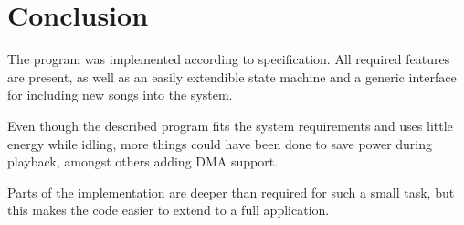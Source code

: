 \section{Conclusion}
The program was implemented according to specification. All required features are present, as well as an easily extendible state machine and a generic interface for including new songs into the system.

Even though the described program fits the system requirements and uses little energy while idling, more things could have been done to save power during playback, amongst others adding DMA support.

Parts of the implementation are deeper than required for such a small task, but this makes the code easier to extend to a full application.

